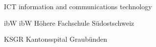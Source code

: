 
\begin{abkuerzungen}[MUSTER] %
    \item[ICT] information and communications technology
    \item[ibW] ibW Höhere Fachschule Südostschweiz
    \item[KSGR] Kantonsspital Graubünden
\end{abkuerzungen}